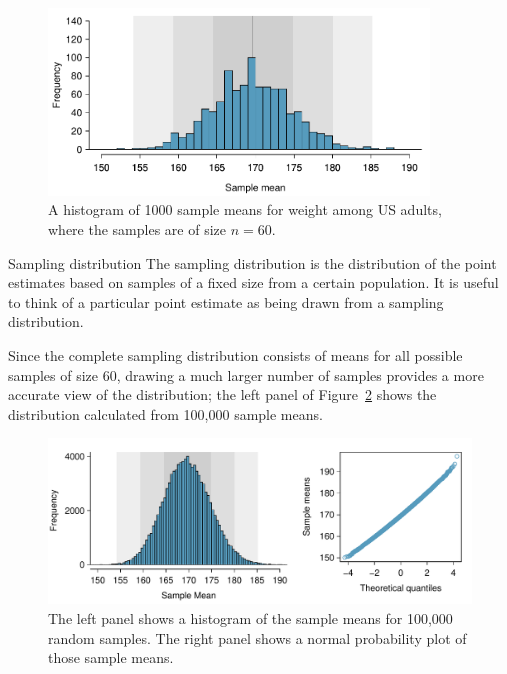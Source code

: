 \begin{figure}[h]
	\centering
	\includegraphics[width=0.9\textwidth]
	{ch_inference_foundations_oi_biostat/figures/cdcWeight1000SampDist/cdcWeight1000SampDist}
	\caption{A histogram of 1000 sample means for weight among US adults, where the samples are of size $n=60$.}
	\label{cdcWeight1000SampDist}
\end{figure}

\begin{onebox}{Sampling distribution}
The sampling distribution is the distribution of the point estimates based on samples of a fixed size from a certain population. It is useful to think of a particular point estimate as being drawn from a sampling distribution.
\end{onebox}

Since the complete sampling distribution consists of means for all possible samples of size 60, drawing a much larger number of samples provides a more accurate view of the distribution; the left panel of Figure~\ref{cdcWeightBigSampDist} shows the distribution calculated from 100,000 sample means. 

\begin{figure}[hht]
 	\centering
 	\includegraphics[width=\textwidth]
 	{ch_inference_foundations_oi_biostat/figures/cdcWeightBigSampDist/cdcWeightBigSampDist.pdf}
 	\caption{The left panel shows a histogram of the sample means for 100,000 random samples. The right panel shows a normal probability plot of those sample means.}
 	\label{cdcWeightBigSampDist}
\end{figure}
 

